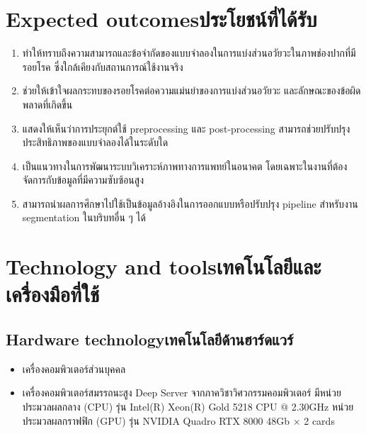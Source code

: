 \section{\ifenglish Expected outcomes\else ประโยชน์ที่ได้รับ\fi}
\begin{enumerate}
    \item ทำให้ทราบถึงความสามารถและข้อจำกัดของแบบจำลองในการแบ่งส่วนอวัยวะในภาพช่องปากที่มีรอยโรค ซึ่งใกล้เคียงกับสถานการณ์ใช้งานจริง
    \item ช่วยให้เข้าใจผลกระทบของรอยโรคต่อความแม่นยำของการแบ่งส่วนอวัยวะ และลักษณะของข้อผิดพลาดที่เกิดขึ้น
    \item แสดงให้เห็นว่าการประยุกต์ใช้ preprocessing และ post-processing สามารถช่วยปรับปรุงประสิทธิภาพของแบบจำลองได้ในระดับใด
    \item เป็นแนวทางในการพัฒนาระบบวิเคราะห์ภาพทางการแพทย์ในอนาคต โดยเฉพาะในงานที่ต้องจัดการกับข้อมูลที่มีความซับซ้อนสูง
    \item สามารถนำผลการศึกษาไปใช้เป็นข้อมูลอ้างอิงในการออกแบบหรือปรับปรุง pipeline สำหรับงาน segmentation ในบริบทอื่น ๆ ได้
\end{enumerate}

\section{\ifenglish Technology and tools\else เทคโนโลยีและเครื่องมือที่ใช้\fi}

\subsection{\ifenglish Hardware technology\else เทคโนโลยีด้านฮาร์ดแวร์\fi}
\begin{itemize}
    \item เครื่องคอมพิวเตอร์ส่วนบุคคล
    \item เครื่องคอมพิวเตอร์สมรรถนะสูง Deep Server จากภาควิชาวิศวกรรมคอมพิวเตอร์ มีหน่วยประมวลผลกลาง (CPU) รุ่น Intel(R) Xeon(R) Gold 5218 CPU @ 2.30GHz หน่วยประมวลผลกราฟฟิก (GPU) รุ่น NVIDIA Quadro RTX 8000 48Gb × 2 cards
\end{itemize}


